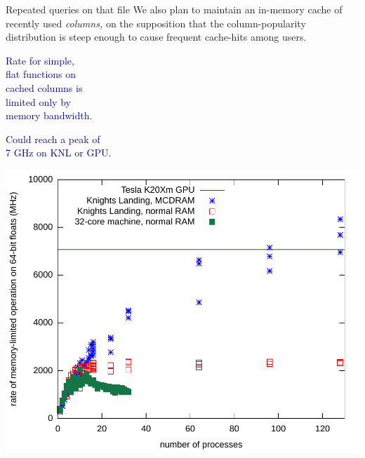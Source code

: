 \documentclass{beamer}
\begin{document}
\begin{frame}{Repeated queries on that file}
\vspace{0.5 cm}
We also plan to maintain an in-memory cache of recently used {\it columns,} on the supposition that the column-popularity distribution is steep enough to cause frequent cache-hits among users.

\vspace{0.4 cm}
\textcolor{darkblue}{Rate for simple, \\ flat functions on \\ cached columns is \\ limited only by \\ memory bandwidth.}

\vspace{0.2 cm}
\textcolor{darkblue}{Could reach a peak of \\ 7 GHz on KNL or GPU.}

\vspace{-7\baselineskip}
\vspace{-0.2 cm}
\hfill \mbox{\includegraphics[width=0.7\linewidth]{cleaner.pdf}\hspace{-0.75 cm}}
\end{frame}
\end{document}
